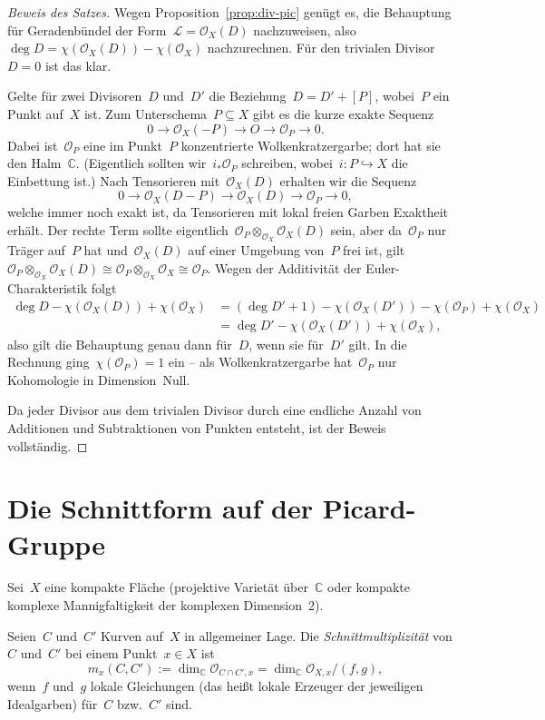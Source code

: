 \documentclass[a4paper,ngerman,12pt]{scrartcl}
\theoremstyle{definition}
\theoremstyle{plain}
\theoremstyle{remark}
\newcommand{\CC}{\mathbb{C}}
\renewcommand{\L}{\mathcal{L}}
\renewcommand{\O}{\mathcal{O}}
\newcommand{\lra}{\longrightarrow}
\begin{document}
\begin{proof}[Beweis des Satzes]Wegen Proposition~\ref{prop:div-pic} genügt es, die Behauptung für
Geradenbündel der Form~$\L = \O_X(D)$ nachzuweisen, also~$\deg D = \chi(\O_X(D))
- \chi(\O_X)$ nachzurechnen. Für den trivialen Divisor~$D = 0$ ist das klar.

Gelte für zwei Divisoren~$D$ und~$D'$ die Beziehung~$D = D' + [P]$, wobei~$P$
ein Punkt auf~$X$ ist. Zum Unterschema~$P \subseteq X$ gibt es die kurze exakte
Sequenz
\[ 0 \lra \O_X(-P) \lra O \lra \O_P \lra 0. \]
Dabei ist~$\O_P$ eine im Punkt~$P$ konzentrierte Wolkenkratzergarbe; dort hat
sie den Halm~$\CC$. (Eigentlich sollten wir~$i_* \O_P$ schreiben, wobei~$i : P
\hookrightarrow X$ die Einbettung ist.) Nach Tensorieren mit~$\O_X(D)$ erhalten
wir die Sequenz
\[ 0 \lra \O_X(D-P) \lra \O_X(D) \lra \O_P \lra 0, \]
welche immer noch exakt ist, da Tensorieren mit lokal freien Garben Exaktheit
erhält. Der rechte Term sollte eigentlich~$\O_P \otimes_{\O_X} \O_X(D)$ sein,
aber da~$\O_P$ nur Träger auf~$P$ hat und~$\O_X(D)$ auf einer Umgebung von~$P$
frei ist, gilt~$\O_P \otimes_{\O_X} \O_X(D) \cong \O_P \otimes_{\O_X} \O_X
\cong \O_P$. Wegen der Additivität der Euler-Charakteristik folgt
\begin{align*}
  \deg D - \chi(\O_X(D)) + \chi(\O_X)
  &= (\deg D' + 1) - \chi(\O_X(D')) - \chi(\O_P) + \chi(\O_X) \\
  &= \deg D' - \chi(\O_X(D')) + \chi(\O_X),
\end{align*}
also gilt die Behauptung genau dann für~$D$, wenn sie für~$D'$ gilt. In die
Rechnung ging~$\chi(\O_P) = 1$ ein -- als Wolkenkratzergarbe
hat~$\O_P$ nur Kohomologie in Dimension~Null.

Da jeder Divisor aus dem trivialen Divisor durch eine endliche Anzahl von
Additionen und Subtraktionen von Punkten entsteht, ist der Beweis vollständig.
\end{proof}


\section{Die Schnittform auf der Picard-Gruppe}

Sei~$X$ eine kompakte Fläche (projektive Varietät über~$\CC$ oder
kompakte komplexe Mannigfaltigkeit der komplexen Dimension~2).

\begin{defn}Seien~$C$ und~$C'$ Kurven auf~$X$ in allgemeiner Lage. Die
\emph{Schnittmultiplizität} von~$C$ und~$C'$ bei einem Punkt~$x \in X$ ist
\[ m_x(C,C') := \dim_\CC \O_{C \cap C',x} = \dim_\CC \O_{X,x}/(f,g), \]
wenn~$f$ und~$g$ lokale Gleichungen (das heißt lokale Erzeuger der jeweiligen
Idealgarben) für~$C$ bzw.~$C'$ sind.
\end{defn}
\end{document}
